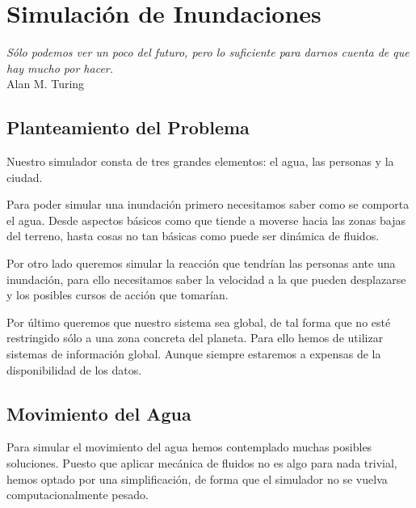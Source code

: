 
\chapter{Simulación de Inundaciones} \label{cap2}

\begin{flushright}
\begin{minipage}{7.85cm}
    {\em Sólo podemos ver un poco del futuro, pero lo suficiente para darnos
    cuenta de que hay mucho por hacer.} \\ Alan M. Turing
\end{minipage}
\end{flushright}

\vspace*{5mm}

\section{Planteamiento del Problema}

Nuestro simulador consta de tres grandes elementos: el agua, las personas y la
ciudad.

Para poder simular una inundación primero necesitamos saber como se comporta el
agua. Desde aspectos básicos como que tiende a moverse hacia las zonas bajas del
terreno, hasta cosas no tan básicas como puede ser dinámica de fluidos.

Por otro lado queremos simular la reacción que tendrían las personas ante una
inundación, para ello necesitamos saber la velocidad a la que pueden desplazarse
y los posibles cursos de acción que tomarían.

Por último queremos que nuestro sistema sea global, de tal forma que no esté
restringido sólo a una zona concreta del planeta. Para ello hemos de utilizar
sistemas de información global. Aunque siempre estaremos a expensas de la
disponibilidad de los datos.

\section{Movimiento del Agua}

Para simular el movimiento del agua hemos contemplado muchas posibles
soluciones. Puesto que aplicar mecánica de fluidos no es algo para nada
trivial\cite{Alam05},
hemos optado por una simplificación, de forma que el simulador no se vuelva
computacionalmente pesado.

